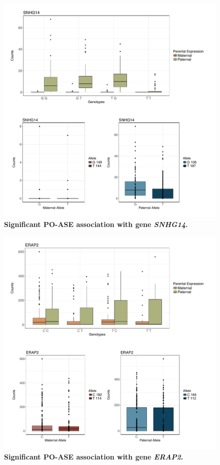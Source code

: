 \begin{figure}[!htb]
\centering \includegraphics[width=5in]{img/ch04/fig-08-SNHG14.pdf}
\caption[Significant PO-ASE association with gene \emph{SNHG14}.]{\textbf{Significant PO-ASE association with gene \emph{SNHG14}.} }
\label{fig:SNHG14}
\end{figure}

\begin{figure}[!htb]
\centering \includegraphics[width=5in]{img/ch04/fig-09-ERAP2.pdf}
\caption[Significant PO-ASE association with gene \emph{ERAP2}.]{\textbf{Significant PO-ASE association with gene \emph{ERAP2}.} }
\label{fig:ERAP2}
\end{figure}


